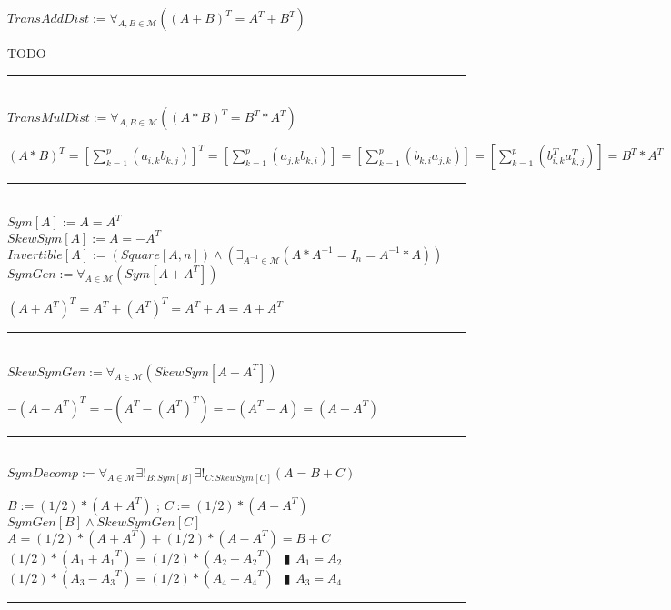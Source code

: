 \documentclass{book}
\newcommand{\abr}{:=}
\newcommand{\pipe}{$\phantom{(}\vrectangleblack\phantom{)}$}
\newcommand{\pr}[1]{\left(#1\right)}
\begin{document}
$TransAddDist \abr \forall_{A, B \in \mathcal{M}}\pr{(A + B)^T = A^T + B ^T}$
\begin{enumerate}
  \lit TODO
\end{enumerate} \vspace{.75mm} \hrule \vspace{.75mm} \ \\ 

$TransMulDist \abr \forall_{A, B \in \mathcal{M}}\pr{(A * B)^T = B^T * A^T}$
\begin{enumerate}
  \lit $(A * B)^T = \left[\sum_{k = 1}^{p}(a_{i, k} b_{k, j})\right]^T = \left[\sum_{k = 1}^{p}(a_{j, k} b_{k, i})\right] = \left[\sum_{k = 1}^{p}(b_{k, i} a_{j, k})\right] =  \left[\sum_{k = 1}^{p}(b^T_{i, k} a^T_{k, j})\right] = B^T * A^T$
\end{enumerate} \vspace{.75mm} \hrule \vspace{.75mm} \ \\

$Sym[A] \abr A = A^T$ \\
$SkewSym[A] \abr A = -A^T$ \\
$Invertible[A] \abr (Square[A, n]) \land \pr{\exists_{A^{-1} \in \mathcal{M}}(A * A^{-1} = I_n = A^{-1} * A)}$ \\

$SymGen \abr \forall_{A \in \mathcal{M}}(Sym[A + A^T])$
\begin{enumerate}
  \lit $(A + A^T)^T = A^T + (A^T)^T = A^T + A = A + A^T$
\end{enumerate} \vspace{.75mm} \hrule \vspace{.75mm} \ \\ 

$SkewSymGen \abr \forall_{A \in \mathcal{M}}(SkewSym[A - A^T])$
\begin{enumerate}
  \lit $-(A - A^T)^T = -\pr{A^T - (A^T)^T} = -(A^T - A) = (A - A^T)$
\end{enumerate} \vspace{.75mm} \hrule \vspace{.75mm} \ \\ 

$SymDecomp \abr \forall_{A \in \mathcal{M}} \exists!_{B : Sym[B]} \exists!_{C : SkewSym[C]}(A = B + C)$
\begin{enumerate}
  \lit $B \abr (1 / 2) * (A + A^T)$ ; $C \abr (1 / 2) * (A - A^T)$
  \lit $SymGen[B] \land SkewSymGen[C]$
  \lit $A = (1 / 2) * (A + A^T) + (1 / 2) * (A - A^T) = B + C$
  \lit $(1 / 2) * (A_1 + {A_1}^T) = (1 / 2) * (A_2 + {A_2}^T)$ \pipe $A_1 = A_2$
  \lit $(1 / 2) * (A_3 - {A_3}^T) = (1 / 2) * (A_4 - {A_4}^T)$ \pipe $A_3 = A_4$
\end{enumerate} \vspace{.75mm} \hrule \vspace{.75mm} \ \\ 
\end{document}
